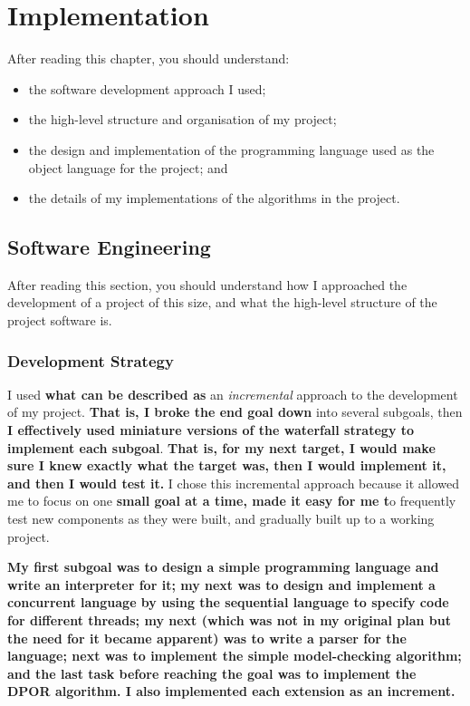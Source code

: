 \documentclass[12pt,a4paper,twoside,openright]{report}
\newenvironment{understandinglist}
	{\begin{itemize} \itemsep 0em}{\end{itemize}}
\begin{document}
\chapter{Implementation}
\label{cha:imp}
After reading this chapter,
you should understand:
\begin{understandinglist}
	\item the software development approach
	I used;
	\item the high-level structure and
	organisation of my project;
	\item the design and implementation of
	the programming language used
	as the object language for the
	project; and
	\item the details of my
	implementations of the
	algorithms in the project.
\end{understandinglist}


\section{Software Engineering}
After reading this section, you should
understand how I approached the
development of a project of this
size, and what the high-level
structure of the project software is.

\subsection{Development Strategy}
I used \textbf{what can be described as} an
\textit{incremental} approach to the
development of my project. \textbf{That is,
I broke the end goal down} into
several subgoals, then \textbf{I effectively
used miniature versions of the waterfall
strategy to implement each subgoal}. \textbf{That
is, for my next target, I would make sure
I knew exactly what the target was, then
I would implement it, and then I would
test it.}
I chose this incremental approach
because it allowed me to focus on one
\textbf{small goal at a time, made it easy for
me t}o frequently test new components as
they were built, and gradually built up
to a working project.

\textbf{My first subgoal was to design
a simple programming language and write an interpreter
for it; my next was to design and implement
a concurrent language
by using the sequential language to
specify code for different threads;
my next (which was not in my original plan but
the need for it became apparent) was to write
a parser for the language; next was to implement
the simple model-checking algorithm; and the
last task before reaching the goal was to
implement the DPOR algorithm. I also implemented
each extension as an increment.}
\end{document}
